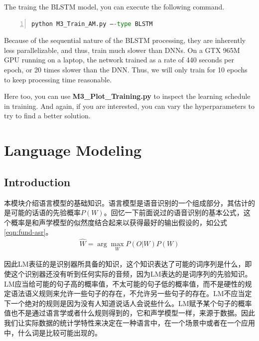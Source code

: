The traing the BLSTM model, you can execute the following command.
\begin{lstlisting}[language = python, numbers=left, 
	 numberstyle=\tiny,keywordstyle=\color{blue!70},
	 commentstyle=\color{red!50!green!50!blue!50},frame=shadowbox,
	 rulesepcolor=\color{red!20!green!20!blue!20},basicstyle=\ttfamily]
python M3_Train_AM.py –-type BLSTM
\end{lstlisting}

Because of the sequential nature of the BLSTM processing, they are inherently less parallelizable, and thus, train much slower than DNNs. On a GTX 965M GPU running on a laptop, the network trained as a rate of 440 seconds per epoch, or 20 times slower than the DNN. Thus, we will only train for 10 epochs to keep processing time reasonable.

Here too, you can use {\bf M3\_Plot\_Training.py} to inspect the learning schedule in training. And again, if you are interested, you can vary the hyperparameters to try to find a better solution.

\section{Language Modeling}
\subsection{Introduction} 
本模块介绍语言模型的基础知识。语言模型是语音识别的一个组成部分，其估计的是可能的话语的先验概率$P(W)$。回忆一下前面说过的语音识别的基本公式，这个概率是和声学模型的似然度结合起来以获得最好的输出假设的，如公式\ref{eqn:fund-asr}。
\begin{align}
\label{eqn:fund-asr}
	\hat{W} = \arg\mathop{\max}_{W} P(O|W)P(W)
\end{align}

因此LM表征的是识别器所具备的知识，这个知识表达了可能的词序列是什么，即使这个识别器还没有听到任何实际的音频，因为LM表达的是词序列的先验知识。LM应当给可能的句子高的概率值，不太可能的句子低的概率值，而不是硬性的规定语法语义规则来允许一些句子的存在，不允许另一些句子的存在。LM不应当定下一个绝对的规则是因为没有人知道说话人会说些什么。LM赋予某个句子的概率值也不是通过语言学或者什么规则得到的，它和声学模型一样，来源于数据。因此我们让实际数据的统计学特性来决定在一种语言中，在一个场景中或者在一个应用中，什么词是比较可能出现的。

